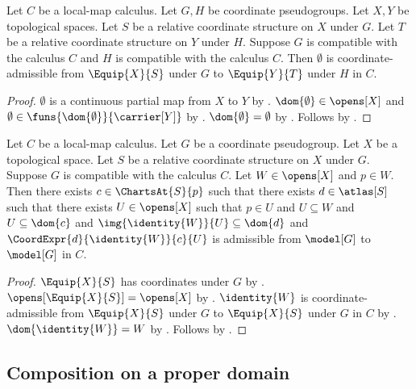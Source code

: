 \begin{theorem}\label{relative_empty_coordinate_map}
    Let $C$ be a local-map calculus.
    Let $G,H$ be coordinate pseudogroups.
    Let $X,Y$ be topological spaces.
    Let $S$ be a relative coordinate structure on $X$ under $G$.
    Let $T$ be a relative coordinate structure on $Y$ under $H$.
    Suppose $G$ is compatible with the calculus $C$ and $H$ is compatible with the calculus $C$.
    Then $\emptyset$ is coordinate-admissible
        from $\Equip{X}{S}$ under $G$ to $\Equip{Y}{T}$ under $H$ in $C$.
\end{theorem}
\begin{proof}
    $\emptyset$ is a continuous partial map from $X$ to $Y$ by .
    $\dom{\emptyset}\in\opens[X]$ and $\emptyset\in\funs{\dom{\emptyset}}{\carrier[Y]}$ by
        .
    $\dom{\emptyset}=\emptyset$ by .
    Follows by .
\end{proof}

\begin{theorem}\label{relative_identity_coordinate_neighborhood}
    Let $C$ be a local-map calculus.
    Let $G$ be a coordinate pseudogroup.
    Let $X$ be a topological space.
    Let $S$ be a relative coordinate structure on $X$ under $G$.
    Suppose $G$ is compatible with the calculus $C$.
    Let $W\in\opens[X]$ and $p\in W$.
    Then there exists $c\in\ChartsAt{S}{p}$ such that there exists $d\in\atlas[S]$
        such that there exists $U\in\opens[X]$ such that
            $p\in U$ and $U\subseteq W$ and $U\subseteq\dom{c}$ and
            $\img{\identity{W}}{U}\subseteq\dom{d}$ and
            $\CoordExpr{d}{\identity{W}}{c}{U}$ is admissible from $\model[G]$ to $\model[G]$ in $C$.
\end{theorem}
\begin{proof}
    $\Equip{X}{S}$ has coordinates under $G$ by .
    $\opens[\Equip{X}{S}]=\opens[X]$ by .
    $\identity{W}$ is coordinate-admissible
        from $\Equip{X}{S}$ under $G$ to $\Equip{X}{S}$ under $G$ in $C$ by
        .
    $\dom{\identity{W}}=W$ by .
    Follows by .
\end{proof}

\subsection{Composition on a proper domain}

